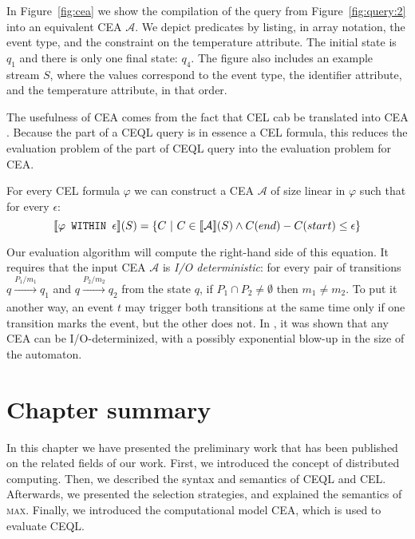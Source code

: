 \begin{example}
  In Figure~\ref{fig:cea} we show the compilation of the query from Figure~\ref{fig:query:2} into an equivalent CEA $\mathcal{A}$. We depict predicates by listing, in array notation, the event type, and the constraint on the temperature attribute. The initial state is $q_{1}$ and there is only one final state: $q_{4}$. The figure also includes an example stream $S$, where the values correspond to the event type, the identifier attribute, and the temperature attribute, in that order.
\end{example}

The usefulness of CEA comes from the fact that CEL cab be translated into CEA \cite{formal-framework-cep,formal-framework-cer}. Because the  part of a CEQL query is in essence a CEL formula, this reduces the evaluation problem of the  part of CEQL query into the evaluation problem for CEA.

\begin{theorem}\label{theorem:cea}
  For every CEL formula $\varphi$ we can construct a CEA $\mathcal{A}$ of size linear in $\varphi$ such that for every $\epsilon$:
  \begin{equation*}
    \llbracket \varphi \texttt{ WITHIN } \epsilon \rrbracket(S) = \{ C \ | \ C \in \llbracket \mathcal{A} \rrbracket(S) \land C(end) - C(start) \le \epsilon \}
  \end{equation*}
\end{theorem}

Our evaluation algorithm will compute the right-hand side of this equation. It requires that the input CEA $\mathcal{A}$ is \emph{I/O deterministic}: for every pair of transitions $q \xrightarrow[]{P_{1}/m_{1}} q_{1}$ and $q \xrightarrow[]{P_{2}/m_{2}} q_{2}$ from the state $q$, if $P_{1} \cap P_{2} \ne \emptyset$ then $m_{1} \ne m_{2}$. To put it another way, an event $t$ may trigger both transitions at the same time only if one transition marks the event, but the other does not. In \cite{formal-framework-cep,formal-framework-cer}, it was shown that any CEA can be I/O-determinized, with a possibly exponential blow-up in the size of the automaton.

\section{Chapter summary}

In this chapter we have presented the preliminary work that has been published on the related fields of our work. First, we introduced the concept of distributed computing. Then, we described the syntax and semantics of CEQL and CEL. Afterwards, we presented the selection strategies, and explained the semantics of \textsc{max}. Finally, we introduced the computational model CEA, which is used to evaluate CEQL.
